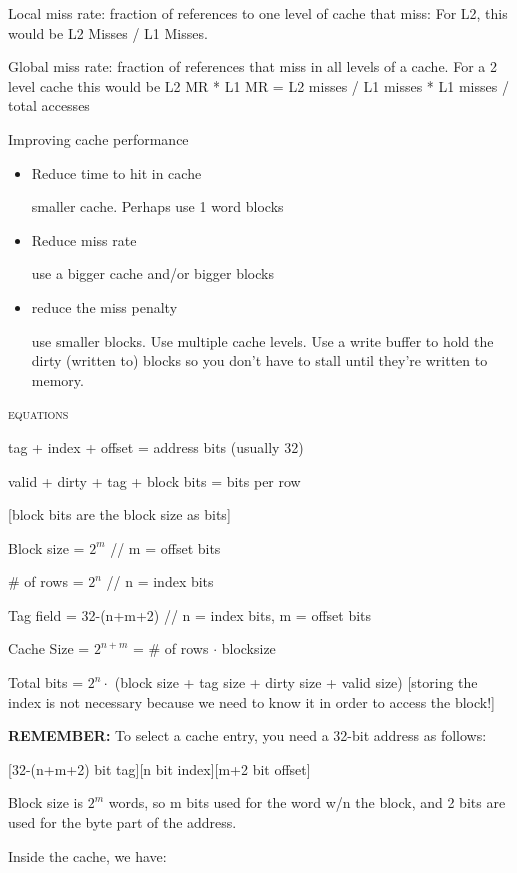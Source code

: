 \documentclass{article}
\begin{document}
Local miss rate: fraction of references to one level of cache that miss: For L2, this would be L2 Misses / L1 Misses.

Global miss rate: fraction of references that miss in all levels of a cache. For a 2 level cache this would be L2 MR * L1 MR = L2 misses / L1 misses * L1 misses / total accesses

Improving cache performance
\begin{itemize}
	\item Reduce time to hit in cache
	
	smaller cache. Perhaps use 1 word blocks
	
	\item Reduce miss rate
	
	use a bigger cache and/or bigger blocks
	
	\item reduce the miss penalty
	
	use smaller blocks. Use multiple cache levels. Use a write buffer to hold the dirty (written to) blocks so you don't have to stall until they're written to memory.
\end{itemize}


\begin{center}\textsc{equations}\end{center} 
	tag + index + offset = address bits (usually 32)
	
	valid + dirty + tag + block bits = bits per row 
	
	[block bits are the block size as bits]
	
	Block size = $2^{m}$ // m = offset bits
	
	\# of rows = $2^{n}$ // n = index bits
	
	Tag field = 32-(n+m+2) // n = index bits, m = offset bits
	
	Cache Size = $2^{n + m}$ = \# of rows $\cdot$ blocksize
	
	Total bits = $2^n \cdot$ (block size + tag size + dirty size + valid size) [storing the index is not necessary because we need to know it in order to access the block!]
	
	\textbf{REMEMBER:}
	To select a cache entry, you need a 32-bit address as follows:
	
	[32-(n+m+2) bit tag][n bit index][m+2 bit offset]
	
	Block size is $2^m$ words, so m bits used for the word w/n the block, and 2 bits are used for the byte part of the address.
	
	Inside the cache, we have:
	
\end{document}
